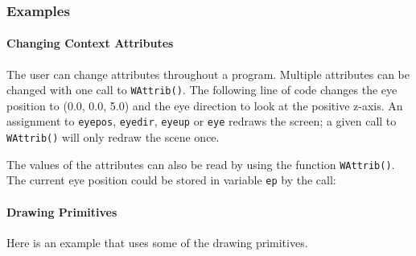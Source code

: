 \subsubsection{Examples}

\paragraph{Changing Context Attributes}
The user can change attributes throughout a program. Multiple
attributes can be changed with one call to \texttt{WAttrib()}.
The following line of code changes the eye
position to (0.0, 0.0, 5.0) and the eye direction to look at the
positive z-axis. An assignment to \texttt{eyepos}, \texttt{eyedir},
\texttt{eyeup} or \texttt{eye}
redraws the screen; a given call to \texttt{WAttrib()} will only redraw the
scene once.


The values of the attributes can also be read by using the function
\texttt{WAttrib()}. The current eye position could be stored in variable
\texttt{ep} by the call:


\paragraph{Drawing Primitives}
Here is an example that uses some of the drawing primitives. 


